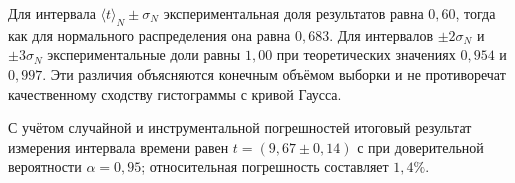 \documentclass[a4paper,14pt]{extarticle}
\begin{document}
	Для интервала $\langle t \rangle_N\pm\sigma_N$ экспериментальная доля результатов равна $0{,}60$, тогда как для нормального распределения она равна $0{,}683$. Для интервалов $\pm2\sigma_N$ и $\pm3\sigma_N$ экспериментальные доли равны $1{,}00$ при теоретических значениях $0{,}954$ и $0{,}997$. Эти различия объясняются конечным объёмом выборки и не противоречат качественному сходству гистограммы с кривой Гаусса.

	С учётом случайной и инструментальной погрешностей итоговый результат измерения интервала времени равен $t=(9{,}67\pm0{,}14)$ с при доверительной вероятности $\alpha=0{,}95$; относительная погрешность составляет $1{,}4\%$.
	
\end{document}

